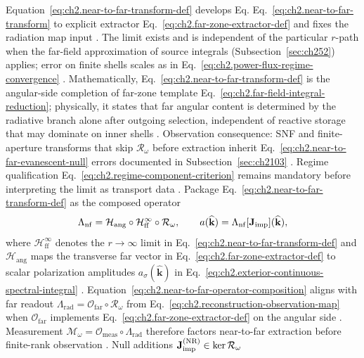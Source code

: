 Equation~\eqref{eq:ch2.near-to-far-transform-def} develops Eq.
Eq.~\eqref{eq:ch2.near-to-far-transform} to explicit extractor
Eq.~\eqref{eq:ch2.far-zone-extractor-def} and fixes the radiation map input
\cite{stratton1941}. The limit exists and is independent of the particular
\(r\)-path when the far-field approximation of source integrals (Subsection~\ref{sec:ch252}) applies; error on finite shells
scales as in Eq.~\eqref{eq:ch2.power-flux-regime-convergence}
\cite{stratton1941}. Mathematically, Eq.~\eqref{eq:ch2.near-to-far-transform-def} is the
angular-side completion of far-zone template
Eq.~\eqref{eq:ch2.far-field-integral-reduction}; physically, it states that far angular content
is determined by the radiative branch alone after outgoing selection, independent of reactive
storage that may dominate on inner shells \cite{stratton1941}. Observation consequence: SNF and
finite-aperture transforms that skip \(\mathcal{R}_\omega\) before extraction inherit
Eq.~\eqref{eq:ch2.near-to-far-evanescent-null} errors documented in
Subsection~\ref{sec:ch2103} \cite{hansen1988}. Regime qualification
Eq.~\eqref{eq:ch2.regime-component-criterion} remains mandatory before interpreting the limit as
transport data \cite{harrington2001}.
Package Eq.~\eqref{eq:ch2.near-to-far-transform-def} as the composed operator
\begin{equation}
\label{eq:ch2.near-to-far-operator-composition}
\Lambda_{\mathrm{nf}}
=
\mathcal{H}_{\mathrm{ang}}\circ\mathcal{H}_{\mathrm{ff}}^{\infty}\circ\mathcal{R}_\omega,
\qquad
a(\widehat{\mathbf{k}})=\Lambda_{\mathrm{nf}}[\mathbf{J}_{\mathrm{imp}}](\widehat{\mathbf{k}}),
\end{equation}
where \(\mathcal{H}_{\mathrm{ff}}^{\infty}\) denotes the \(r\to\infty\) limit in
Eq.~\eqref{eq:ch2.near-to-far-transform-def} and \(\mathcal{H}_{\mathrm{ang}}\) maps the
transverse far vector in Eq.~\eqref{eq:ch2.far-zone-extractor-def} to scalar polarization
amplitudes \(a_\sigma(\widehat{\mathbf{k}})\) in
Eq.~\eqref{eq:ch2.exterior-continuous-spectral-integral}
\cite{stratton1941}. Equation~\eqref{eq:ch2.near-to-far-operator-composition}
aligns with far readout
\(\Lambda_{\mathrm{rad}}=\mathcal{O}_{\mathrm{far}}\circ\mathcal{R}_\omega\) from
Eq.~\eqref{eq:ch2.reconstruction-observation-map} when \(\mathcal{O}_{\mathrm{far}}\) implements
Eq.~\eqref{eq:ch2.far-zone-extractor-def} on the angular side \cite{stratton1941}. Measurement
\(\mathcal{M}_\omega=\mathcal{O}_{\mathrm{meas}}\circ\Lambda_{\mathrm{rad}}\) therefore factors
near-to-far extraction before finite-rank observation
\cite{harrington2001}. Null additions \(\mathbf{J}_{\mathrm{imp}}^{\mathrm{(NR)}}\in\ker\mathcal{R}_\omega\)
